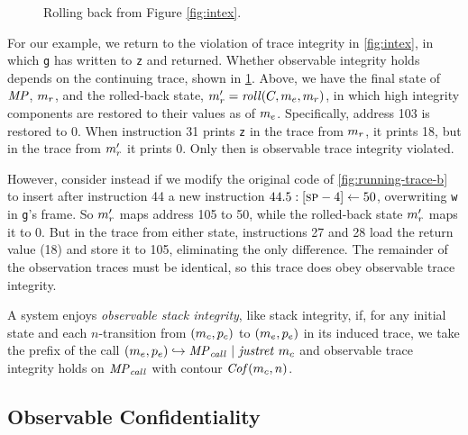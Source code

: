 \documentclass[acmsmall,review,anonymous]{acmart}\settopmatter{printfolios=true,printccs=false,printacmref=false}
\begin{document}
{    \begin{figure}
      \integritylazyexample
      \caption{Rolling back from Figure \ref{fig:intex}.}
      \label{fig:intlex}
    \end{figure}

    For our example, we return to the violation of trace integrity in
    \cref{fig:intex}, in which {\tt g} has written to {\tt z} and returned.
    Whether observable integrity holds depends on the continuing trace, shown
    in \cref{fig:intlex}. Above, we have the final state of \(\mathit{MP}\),
    \(m_r\), and the rolled-back state, \(m_r' =
    \mathit{roll}(C,m_e,m_r)\), in which high integrity
    components are restored to their values as of \(m_e\). Specifically,
    address 103 is restored to 0. When instruction 31 prints {\tt z} in the
    trace from \(m_r\), it prints 18, but in the trace from \(m_r'\)
    it prints 0. Only then is observable trace integrity violated.

    However, consider instead if we modify the original code of \cref{fig:running-trace-b} to insert after instruction 44 a new
    instruction \(44.5: [\textsc{sp}-4] \leftarrow 50\), overwriting {\tt w} in
    {\tt g}'s frame. So \(m_r'\) maps address 105 to 50, while the
    rolled-back state \(m_r'\) maps it to 0. But in the trace from either
    state, instructions 27 and 28 load the return value (18) and store it to
    105, eliminating the only difference. The remainder of the observation
    traces must be identical, so this trace does obey observable trace
    integrity.


      A system enjoys {\em observable stack integrity}, like stack integrity,
      if, for any initial state and each \(n\)-transition from
      \((m_c,p_c)\) to \((m_e,p_e)\) in its
      induced trace, we take the prefix of the call
      \((m_e,p_e) \hookrightarrow \mathit{MP}_{\mathit{call}} ~ | ~ \mathit{justret}\ m_c\)
      and observable trace integrity holds on \(\mathit{MP}_{\mathit{call}}\) with
      contour \(\mathit{Cof}(m_c,n)\).

  \subsection{Observable Confidentiality}

}
\end{document}

